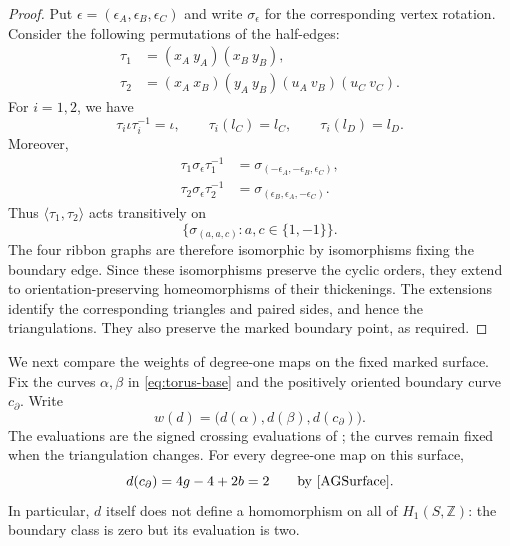 \documentclass[12pt,a4paper,english,reqno]{amsart}
\theoremstyle{plain}
\theoremstyle{definition}
\numberwithin{equation}{section}
\def\al{\alpha}
\def\be{\beta}
\def\io{\iota}
\def\si{\sigma}
\def\bbZ{{\mathbb Z}}
\begin{document}
\begin{proof}
Put $\epsilon=(\epsilon_A,\epsilon_B,\epsilon_C)$ and write
$\si_\epsilon$ for the corresponding vertex rotation. Consider the
following permutations of the half-edges:
\[
\begin{aligned}
 \tau_1&=(x_A\ y_A)(x_B\ y_B),\\
 \tau_2&=(x_A\ x_B)(y_A\ y_B)(u_A\ v_B)(u_C\ v_C).
\end{aligned}
\]
For $i=1,2$, we have
\[
 \tau_i\io\tau_i^{-1}=\io,\qquad
 \tau_i(l_C)=l_C,\qquad \tau_i(l_D)=l_D.
\]
Moreover,
\[
\begin{aligned}
 \tau_1\si_\epsilon\tau_1^{-1}
   &=\si_{(-\epsilon_A,-\epsilon_B,\epsilon_C)},\\
 \tau_2\si_\epsilon\tau_2^{-1}
   &=\si_{(\epsilon_B,\epsilon_A,-\epsilon_C)}.
\end{aligned}
\]
Thus $\langle\tau_1,\tau_2\rangle$ acts transitively on
\[
 \{\si_{(a,a,c)}:a,c\in\{1,-1\}\}.
\]
The four ribbon graphs are therefore isomorphic by isomorphisms fixing
the boundary edge. Since these isomorphisms preserve the cyclic orders,
they extend to orientation-preserving homeomorphisms of their
thickenings. The extensions identify the corresponding triangles and
paired sides, and hence the triangulations. They also preserve the
marked boundary point, as required.
\end{proof}

We next compare the weights of degree-one maps on the fixed marked surface.
Fix the curves $\al,\be$ in \eqref{eq:torus-base} and the positively oriented boundary curve $c_\partial$. Write
\[
 w(d)=\bigl(d(\al),d(\be),d(c_\partial)\bigr).
\]
The evaluations are the signed crossing evaluations of \cite[Section 2.2]{AGSurface}; the curves remain fixed when the triangulation changes. For every degree-one map on this surface,
\[
 d(c_\partial)=4g-4+2b=2
 \qquad\text{by \cite[Proposition 2.9]{AGSurface}}.
\]
In particular, $d$ itself does not define a homomorphism on all of $H_1(S,\bbZ)$: the boundary class is zero but its evaluation is two.
\end{document}
